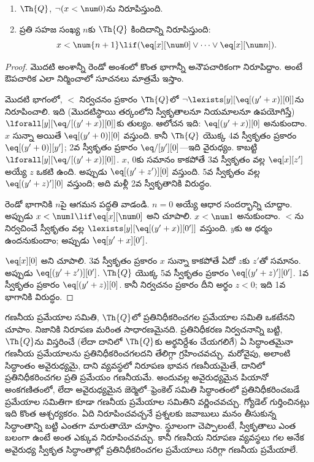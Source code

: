 \documentclass[../../../include/open-logic-section]{subfiles}
\begin{document}
\begin{lem}
\begin{enumerate}
\item $\Th{Q}$, $\lnot (x < \num 0)$ను నిరూపిస్తుంది.
\item ప్రతి సహజ సంఖ్య $n$కు $\Th{Q}$ కిందిదాన్ని నిరూపిస్తుంది:
\[
x < \num {n+1} \lif (\eq[x][\num 0] \lor \dots \lor \eq[x][\num n]).
\]
\end{enumerate}
\end{lem}

\begin{proof}
మొదటి అంశాన్నీ రెండో అంశంలో కొంత భాగాన్నీ అనౌపచారికంగా నిరూపిద్దాం. అంటే ఔపచారిక  ఎలా నిర్మించాలో సూచనలు మాత్రమే ఇస్తాం.

మొదటి భాగంలో, $<$ నిర్వచనం ప్రకారం $\Th{Q}$లో $\lnot
\lexists[y][\eq[(y'+x)][0]]$ను నిరూపించాలి. ఇది (మొదటిస్థాయి తర్కంలోని స్వీకృతాలనూ నియమాలనూ ఉపయోగిస్తే) $\lforall[y][\eq/[(y' +
    x)][0]]$కు తుల్యం. ఆలోచన ఇది: $\eq[(y'+x)][0]$ అనుకుందాం. $x$ సున్నా అయితే $\eq[(y' + 0)][0]$ వస్తుంది. కానీ $\Th{Q}$ యొక్క 4వ స్వీకృతం ప్రకారం $\eq[(y' + 0)][y']$; 2వ స్వీకృతం ప్రకారం $\eq/[y'][0]$---ఇది వైరుధ్యం. కాబట్టి $\lforall[y][\eq/[(y' +x)][0]]$. $x$, $0$కు సమానం కాకపోతే 3వ స్వీకృతం వల్ల $\eq[x][z']$ అయ్యే $z$ ఒకటి ఉంది. అప్పుడు $\eq[(y' + z')][0]$ వస్తుంది. 5వ స్వీకృతం వల్ల $\eq[(y' + z)'][0]$ వస్తుంది; అది మళ్లీ 2వ స్వీకృతానికి విరుద్ధం.

రెండో భాగానికి $n$పై ఆగమన పద్ధతి వాడండి. $n =0$ అయ్యే ఆధార సందర్భాన్ని చూద్దాం. అప్పుడు $x < \num 1 \lif \eq[x][\num
  0]$ అని చూపాలి. $x < \num 1$ అనుకుందాం. $<$ను నిర్వచించే స్వీకృతం వల్ల $\lexists[y][\eq[(y'+x)][0']]$ వస్తుంది. $y$కు ఆ ధర్మం ఉందనుకుందాం; అప్పుడు $\eq[y'+x][0']$.

$\eq[x][0]$ అని చూపాలి. 3వ స్వీకృతం ప్రకారం $x$ సున్నా కాకపోతే ఏదో $z$కు $z'$తో సమానం. అప్పుడు $\eq[(y' + z')][0']$. $\Th{Q}$ యొక్క 5వ స్వీకృతం ప్రకారం $\eq[(y'+z)'][0']$. 1వ స్వీకృతం ప్రకారం $\eq[(y' +
    z)][0]$. కానీ నిర్వచనం ప్రకారం దీని అర్థం $z < 0$; ఇది 1వ భాగానికి విరుద్ధం.
\end{proof}

\begin{explain}
గణనీయ ప్రమేయాల సమితి, $\Th{Q}$లో ప్రతినిధీకరించగల ప్రమేయాల సమితి ఒకటేనని చూపాం. నిజానికి నిరూపణ మరింత సాధారణమైనది. ప్రతినిధీకరణ నిర్వచనాన్ని బట్టి, $\Th{Q}$ను విస్తరించే (లేదా దానిలో $\Th{Q}$కు అర్థనిర్దేశం చేయగలిగే) ఏ సిద్ధాంతమైనా గణనీయ ప్రమేయాలను ప్రతినిధీకరించగలదని తేలిగ్గా గ్రహించవచ్చు. మరోవైపు, అలాంటి సిద్ధాంతం అవైరుధ్యమై, దాని  వ్యవస్థలో నిరూపణ భావన గణనీయమైతే, దానిలో ప్రతినిధీకరించగల ప్రతి ప్రమేయం గణనీయమే. అందువల్ల అవైరుధ్యమైన పియానో అంకగణితంలో, లేదా అవైరుధ్యమైన జెర్మెలో--ఫ్రెంకెల్ సమితి సిద్ధాంతంలో ప్రతినిధీకరించబడే ప్రమేయాల సమితిగా కూడా గణనీయ ప్రమేయాల సమితిని వర్ణించవచ్చు. గ్యోడెల్ గుర్తించినట్లు ఇది కొంత ఆశ్చర్యకరం. ఏది నిరూపించవచ్చనే ప్రశ్నలకు జవాబులు మనం తీసుకున్న సిద్ధాంతాన్ని బట్టి ఎంతగా మారుతాయో చూస్తాం. స్థూలంగా చెప్పాలంటే, స్వీకృతాలు ఎంత బలంగా ఉంటే అంత ఎక్కువ నిరూపించవచ్చు. కానీ గణనీయ నిరూపణ వ్యవస్థలు గల అనేక అవైరుధ్య స్వీకృత సిద్ధాంతాల్లో ప్రతినిధీకరించగల ప్రమేయాలు సరిగ్గా గణనీయ ప్రమేయాలే.
\end{explain}
\end{document}
